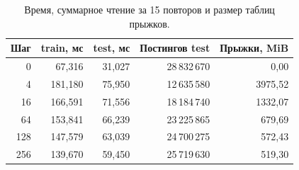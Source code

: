 \begin{table}[H]\centering
\begin{tabular}{rrrrr}\toprule
Шаг & train, мс & test, мс & Постингов test & Прыжки, MiB\\\midrule
0 & 67,316 & 31,027 & 28\,832\,670 & 0,00\\
4 & 181,180 & 75,950 & 12\,635\,580 & 3975,52\\
16 & 166,591 & 71,556 & 18\,184\,740 & 1332,07\\
64 & 153,841 & 66,239 & 23\,225\,865 & 679,69\\
128 & 147,579 & 63,039 & 24\,700\,275 & 572,43\\
256 & 139,670 & 59,450 & 25\,719\,630 & 519,30\\
\bottomrule\end{tabular}
\caption{Время, суммарное чтение за 15 повторов и размер таблиц прыжков.}
\end{table}
